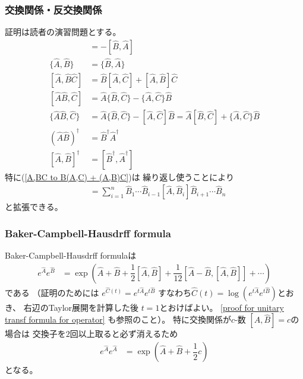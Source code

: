\subsubsection{交換関係・反交換関係}

証明は読者の演習問題とする。
\begin{align}
    [\hat{A}, \hat{B}] &= - [\hat{B}, \hat{A}]
\\
    \{\hat{A}, \hat{B}\} &= \{\hat{B}, \hat{A}\}
\\
    [\hat{A}, \hat{B}\hat{C}]
   &=
   \hat{B}[\hat{A}, \hat{C}]
+
    [\hat{A}, \hat{B}] \hat{C}
\label{A,BC to B(A,C) + (A,B)C}
\\
    [\hat{A}\hat{B}, \hat{C}]
   &=
   \hat{A}\{\hat{B}, \hat{C}\}
-
    \{\hat{A}, \hat{C}\} \hat{B}
\\
    \{ \hat{A}\hat{B}, \hat{C} \}
   &=
   \hat{A}\{\hat{B}, \hat{C}\}
-
    [ \hat{A}, \hat{C} ] \hat{B}
=
   \hat{A} [ \hat{B}, \hat{C} ]
+
    \{\hat{A}, \hat{C}\} \hat{B}
\\
    \left(\hat{A}\hat{B}\right)^\dagger
    &=
    \hat{B}^\dagger\hat{A}^\dagger
\\
    [\hat{A}, \hat{B}]^\dagger
    &=
    [\hat{B}^\dagger, \hat{A}^\dagger]
\end{align}
特に(\ref{A,BC to B(A,C) + (A,B)C})は
繰り返し使うことにより
\begin{align}
    [\hat{A}, \hat{B}_1\hat{B}_2\cdots\hat{B}_n]
   &=
   \sum_{i=1}^n
   \hat{B}_1\cdots\hat{B}_{i-1}
   [\hat{A}, \hat{B}_i]
   \hat{B}_{i+1}\cdots\hat{B}_n
\end{align}
と拡張できる。

\subsubsection{Baker-Campbell-Hausdrff formula}

Baker-Campbell-Hausdrff formulaは
\begin{align}
    e^{\hat{A}} e^{\hat{B}}
    &=
    \exp\left(
        \hat{A} + \hat{B}
        + \dfrac{1}{2}[\hat{A},\hat{B}]
        + \dfrac{1}{12}[\hat{A} - \hat{B},[\hat{A},\hat{B}]]
        + \cdots
    \right)
\label{BCH formula}
\end{align}
である
（証明のためには
$e^{\hat{C}(t)}
= e^{t\hat{A}} e^{t\hat{B}}$
すなわち$\hat{C}(t) = \log (
    e^{t\hat{A}} e^{t\hat{B}}
)$とおき、
右辺のTaylor展開を計算した後
$t=1$とおけばよい。
\ref{proof for unitary transf formula for operator}
も参照のこと）。
特に交換関係が$c$-数
$[\hat{A},\hat{B}]=c$の場合は
交換子を$2$回以上取ると必ず消えるため
\begin{align}
    e^{\hat{A}} e^{\hat{A}}
    &=
    \exp\left(
        \hat{A} + \hat{B}
        + \dfrac{1}{2}c
    \right)
\label{simpler BCH formula}    
\end{align}
となる。


